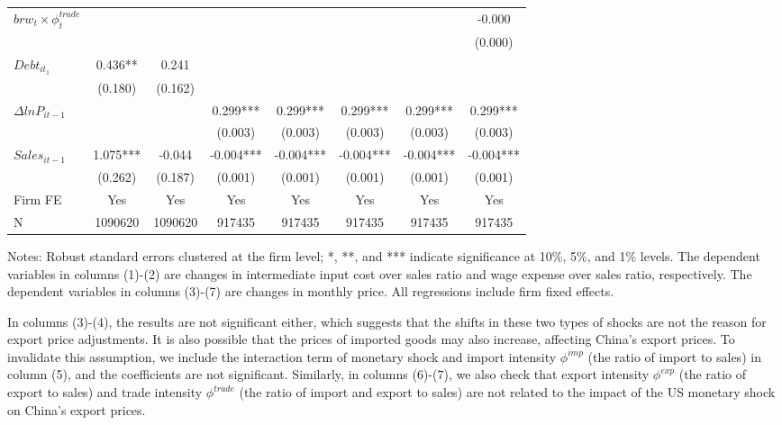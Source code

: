 \begin{table}[htbp]
{\begin{threeparttable}
\begin{tabular}{lccccccc}
        $brw_t \times \phi^{trade}_t$ &       &       &       &       &       &       & -0.000 \\
              &       &       &       &       &       &       & (0.000) \\
        $Debt_{it_1}$ & 0.436** & 0.241 &       &       &       &       &  \\
              & (0.180) & (0.162) &       &       &       &       &  \\
        $\Delta ln P_{it-1}$ &       &       & 0.299*** & 0.299*** & 0.299*** & 0.299*** & 0.299*** \\
              &       &       & (0.003) & (0.003) & (0.003) & (0.003) & (0.003) \\
        $Sales_{it-1}$ &  1.075*** & -0.044   & -0.004*** & -0.004*** & -0.004*** & -0.004*** & -0.004*** \\
              &  (0.262) & (0.187) & (0.001) & (0.001) & (0.001) & (0.001) & (0.001) \\
        \midrule
        Firm FE & Yes   & Yes   & Yes   & Yes   & Yes   & Yes   & Yes \\
        N     & 1090620 & 1090620 & 917435 & 917435 & 917435 & 917435 & 917435 \\
        \bottomrule
    \end{tabular}
        \begin{tablenotes}
            \footnotesize
            \item Notes: Robust standard errors clustered at the firm level;  *, **, and *** indicate significance at 10\%, 5\%, and 1\% levels. The dependent variables in columns (1)-(2) are changes in intermediate input cost over sales ratio and wage expense over sales ratio, respectively. The dependent variables in columns (3)-(7) are changes in monthly price. All regressions include firm fixed effects.
	\end{tablenotes}
    \end{threeparttable}
    }
    \label{tab.other}
\end{table}

In columns (3)-(4), the results are not significant either, which suggests that the shifts in these two types of shocks are not the reason for export price adjustments. It is also possible that the prices of imported goods may also increase, affecting China's export prices. To invalidate this assumption, we include the interaction term of monetary shock and import intensity $\phi^{imp}$ (the ratio of import to sales) in column (5), and the coefficients are not significant. Similarly, in columns (6)-(7), we also check that export intensity $\phi^{exp}$ (the ratio of export to sales) and trade intensity $\phi^{trade}$ (the ratio of import and export to sales) are not related to the impact of the US monetary shock on China's export prices.

